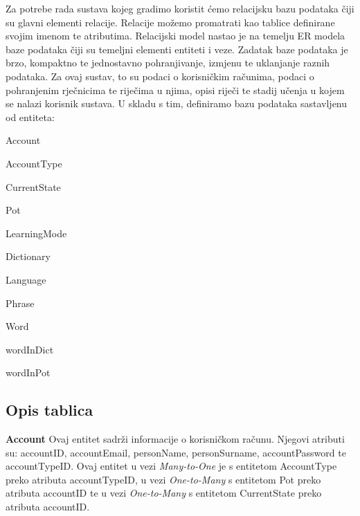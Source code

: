 \hspace*{6mm} Za potrebe rada sustava kojeg gradimo koristit ćemo relacijsku bazu podataka čiji su glavni elementi relacije. Relacije možemo promatrati kao tablice definirane svojim imenom te atributima. Relacijski model nastao je na temelju ER modela baze podataka čiji su temeljni elementi entiteti i veze. Zadatak baze podataka je brzo, kompaktno te jednostavno pohranjivanje, izmjenu te uklanjanje raznih podataka. Za ovaj sustav, to su podaci o korisničkim računima, podaci o pohranjenim rječnicima te riječima u njima, opisi riječi te stadij učenja u kojem se nalazi korisnik sustava. U skladu s tim, definiramo bazu podataka sastavljenu od entiteta:
			
			\begin{packed_item}
				
				\item Account
				\item AccountType
				\item CurrentState
				\item Pot
				\item LearningMode
				\item Dictionary
				\item Language
				\item Phrase
				\item Word
				\item wordInDict
				\item wordInPot
				
			\end{packed_item}
		
			\subsection{Opis tablica}
			

				
				
				\hspace*{6mm} \textbf{Account} Ovaj entitet sadrži informacije o korisničkom računu. Njegovi atributi su: accountID, accountEmail, personName, personSurname, accountPassword te accountTypeID. Ovaj entitet u vezi \textit{Many-to-One} je s entitetom AccountType preko atributa accountTypeID, u vezi \textit{One-to-Many} s entitetom Pot preko atributa accountID te u vezi \textit{One-to-Many} s entitetom CurrentState preko atributa accountID.
				

